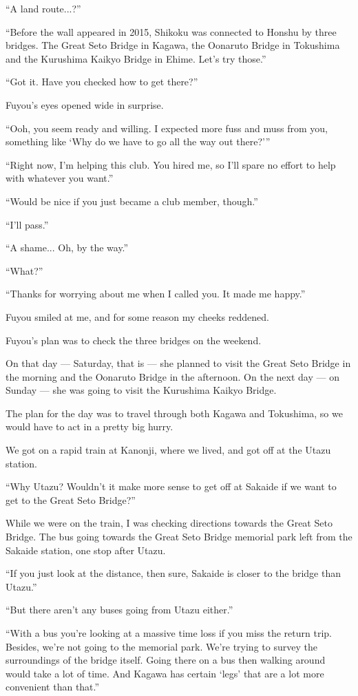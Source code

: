 ``A land route...?''

``Before the wall appeared in 2015, Shikoku was connected to Honshu by three bridges. The Great Seto Bridge in Kagawa, the Oonaruto Bridge in Tokushima and the Kurushima Kaikyo Bridge in Ehime. Let's try those.''

``Got it. Have you checked how to get there?''

Fuyou's eyes opened wide in surprise.

``Ooh, you seem ready and willing. I expected more fuss and muss from you, something like `Why do we have to go all the way out there?'\thinspace''

``Right now, I'm helping this club. You hired me, so I'll spare no effort to help with whatever you want.''

``Would be nice if you just became a club member, though.''

``I'll pass.''

``A shame... Oh, by the way.''

``What?''

``Thanks for worrying about me when I called you. It made me happy.''

Fuyou smiled at me, and for some reason my cheeks reddened.

Fuyou's plan was to check the three bridges on the weekend.

On that day --- Saturday, that is --- she planned to visit the Great Seto Bridge in the morning and the Oonaruto Bridge in the afternoon. On the next day --- on Sunday --- she was going to visit the Kurushima Kaikyo Bridge.

The plan for the day was to travel through both Kagawa and Tokushima, so we would have to act in a pretty big hurry.

We got on a rapid train at Kanonji, where we lived, and got off at the Utazu station.

``Why Utazu? Wouldn't it make more sense to get off at Sakaide if we want to get to the Great Seto Bridge?''

While we were on the train, I was checking directions towards the Great Seto Bridge. The bus going towards the Great Seto Bridge memorial park left from the Sakaide station, one stop after Utazu.

``If you just look at the distance, then sure, Sakaide is closer to the bridge than Utazu.''

``But there aren't any buses going from Utazu either.''

``With a bus you're looking at a massive time loss if you miss the return trip. Besides, we're not going to the memorial park. We're trying to survey the surroundings of the bridge itself. Going there on a bus then walking around would take a lot of time. And Kagawa has certain `legs' that are a lot more convenient than that.''

